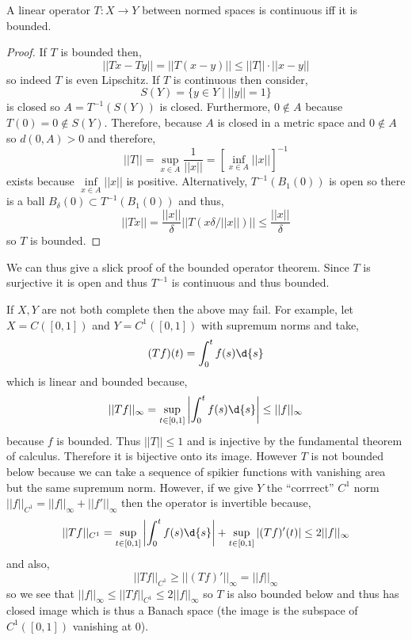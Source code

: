 \documentclass[12pt]{article}
\begin{document}
\begin{lemma}
A linear operator $T : X \to Y$ between normed spaces is continuous iff it is bounded.
\end{lemma}

\begin{proof}
If $T$ is bounded then,
\[ || Tx - Ty || = || T(x - y) || \le || T || \cdot || x - y || \]
so indeed $T$ is even Lipschitz. If $T$ is continuous then consider,
\[ S(Y) = \{ y \in Y \mid || y || = 1 \} \]
is closed so $A = T^{-1}(S(Y))$ is closed. Furthermore, $0 \notin A$ because $T(0) = 0 \notin S(Y)$. Therefore, because $A$ is closed in a metric space and $0 \notin A$ so $d(0, A) > 0$ and therefore,
\[ || T || = \sup_{x \in A} \frac{1}{|| x ||} = \left[ \inf_{x \in A} || x || \right]^{-1} \]
exists because $\inf\limits_{x \in A} || x ||$ is positive. Alternatively, $T^{-1}(B_1(0))$ is open so there is a ball $B_\delta(0) \subset T^{-1}(B_1(0))$ and thus,
\[ || T x || = \frac{|| x ||}{\delta} || T(x \delta / || x ||) || \le \frac{|| x ||}{\delta} \]
so $T$ is bounded.
\end{proof}

\begin{rmk}
We can thus give a slick proof of the bounded operator theorem. Since $T$ is surjective it is open and thus $T^{-1}$ is continuous and thus bounded.
\end{rmk}

\begin{ex}
If $X, Y$ are not both complete then the above may fail. For example, let $X = C([0, 1])$ and $Y = C^1([0, 1])$ with supremum norms and take,
\[ (T f)(t) = \int_0^t f(s) \d{s} \]
which is linear and bounded because,
\[ || T f ||_{\infty} = \sup_{t \in [0, 1]} \left| \int_0^t f(s) \d{s} \right| \le || f ||_{\infty}  \]
because $f$ is bounded. Thus $|| T || \le 1$ and is injective by the fundamental theorem of calculus. Therefore it is bijective onto its image. However $T$ is not bounded below because we can take a sequence of spikier functions with vanishing area but the same supremum norm. However, if we give $Y$ the ``corrrect'' $C^1$ norm $|| f ||_{C^1} = || f ||_\infty + || f' ||_\infty$ then the operator is invertible because,
\[ || T f ||_{C^1} = \sup_{t \in [0, 1]} \left| \int_0^t f(s) \d{s} \right|  + \sup_{t \in [0,1]} |(T f)'(t)| \le 2 || f ||_{\infty} \]
and also,
\[ || T f ||_{C^1} \ge || (T f)' ||_{\infty} = || f ||_{\infty} \]
so we see that $|| f ||_\infty \le || T f ||_{C^1} \le 2 ||  f ||_{\infty}$ so $T$ is also bounded below and thus has closed image which is thus a Banach space (the image is the subspace of $C^1([0,1])$ vanishing at $0$).
\end{ex}
\end{document}
